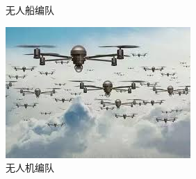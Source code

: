 \documentclass{beamer}
\theoremstyle{remark}
\begin{document}
\begin{frame}
\begin{figure}[htbp]
\begin{minipage}[c]{0.33\textwidth}
				\caption{\label{}无人船编队}
		\end{minipage}
		\begin{minipage}[c]{0.33\textwidth}
			\centering
			\includegraphics[width=1\linewidth]{Fig/applied_fomation.jpeg}
			\caption{\label{}无人机编队}
		\end{minipage}
	\end{figure}		
\end{frame}
\end{document}
